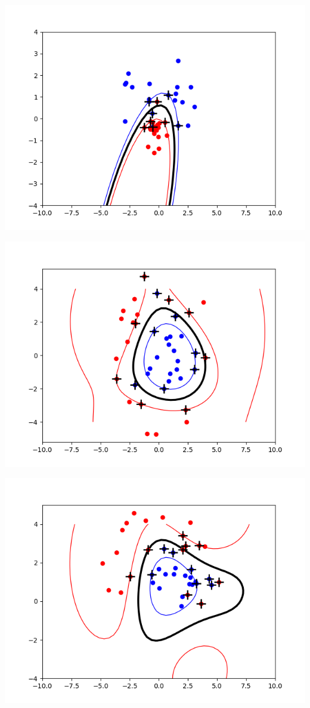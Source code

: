 \documentclass{article}
\begin{document}
\includegraphics[scale = 0.66]{Figure_1.png}

\includegraphics[scale = 0.66]{Figure_2.png}

\includegraphics[scale = 0.66]{Figure_3.png}
\end{document}

